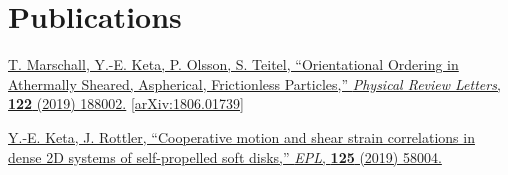 \documentclass[letterpaper]{cvtemplate_fr} %
\begin{document}
\section{Publications}

\href{https://doi.org/10.1103/PhysRevLett.122.188002}{T. Marschall, Y.-E. Keta, P. Olsson, S. Teitel, ``Orientational Ordering in Athermally Sheared, Aspherical, Frictionless Particles,'' \textit{Physical Review Letters}, \textbf{122} (2019) 188002.} \href{https://arxiv.org/abs/1806.01739}{[arXiv:1806.01739]}

\href{https://doi.org/10.1209/0295-5075/125/58004}{Y.-E. Keta, J. Rottler, ``Cooperative motion and shear strain correlations in dense 2D systems of self-propelled soft disks,'' \textit{EPL}, \textbf{125} (2019) 58004.}\\

\end{document}
